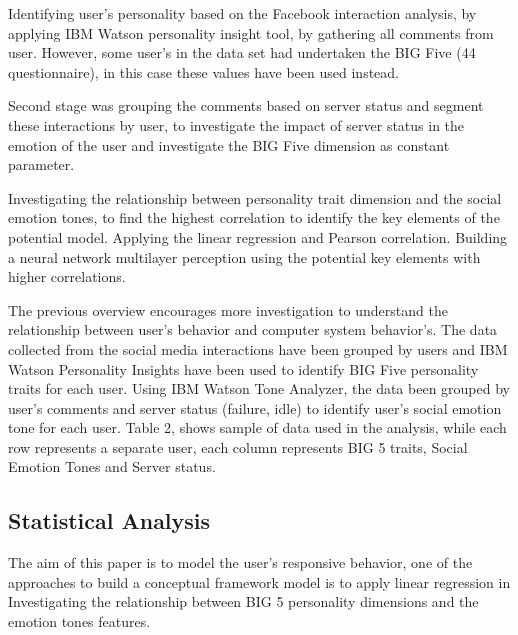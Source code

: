 \documentclass[graybox]{svmult}
\begin{document}
Identifying user’s personality based on the Facebook interaction
analysis, by applying IBM Watson personality insight tool, by
gathering all comments from user. However, some user’s in the data set
had undertaken the BIG Five (44 questionnaire), in this case these
values have been used instead.

Second stage was grouping the comments based on server status and
segment these interactions by user, to investigate the impact of
server status in the emotion of the user and investigate the BIG Five
dimension as constant parameter.

Investigating the relationship between personality trait dimension and
the social emotion tones, to find the highest correlation to identify
the key elements of the potential model. Applying the linear
regression and Pearson correlation. Building a neural network
multilayer perception using the potential key elements with higher
correlations.

The previous overview encourages more investigation to understand the
relationship between user’s behavior and computer system
behavior’s. The data collected from the social media interactions have
been grouped by users and IBM Watson Personality Insights have been
used to identify BIG Five personality traits for each user. Using IBM
Watson Tone Analyzer, the data been grouped by user’s comments and
server status (failure, idle) to identify user’s social emotion tone
for each user. Table 2, shows sample of data used in the analysis,
while each row represents a separate user, each column represents BIG
5 traits, Social Emotion Tones and Server status. 

\subsection{Statistical Analysis}

The aim of this paper is to model the user’s responsive behavior, one
of the approaches to build a conceptual framework model is to apply
linear regression in Investigating the relationship between BIG 5
personality dimensions and the emotion tones features. 
\end{document}
